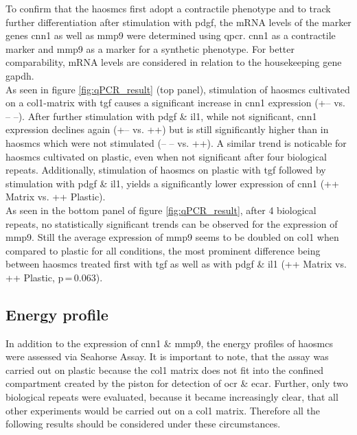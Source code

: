     To confirm that the \acp{haosmc} first adopt a contractile phenotype and to track further differentiation after stimulation with \ac{pdgf}, the \ac{mRNA} levels of the marker genes \ac{cnn1} as well as \ac{mmp9} were determined using \ac{qpcr}. \ac{cnn1} as a contractile marker and \ac{mmp9} as a marker for a synthetic phenotype. For better comparability, \ac{mRNA} levels are considered in relation to the housekeeping gene \ac{gapdh}.\\
    As seen in figure \ref{fig:qPCR_result} (top panel), stimulation of \acp{haosmc} cultivated on a \ac{col1}-matrix with \ac{tgf} causes a significant increase in \ac{cnn1} expression (+– vs. – –). After further stimulation with \ac{pdgf} \& \ac{il1}, while not significant, \ac{cnn1} expression declines again (+– vs. ++) but is still significantly higher than in \acp{haosmc} which were not stimulated (– – vs. ++). A similar trend is noticable for \acp{haosmc} cultivated on plastic, even when not significant after four biological repeats. Additionally, stimulation of \acp{haosmc} on plastic with \ac{tgf} followed by stimulation with \ac{pdgf} \& \ac{il1}, yields a significantly lower expression of \ac{cnn1} (++ Matrix vs. ++ Plastic).\\
    As seen in the bottom panel of figure \ref{fig:qPCR_result}, after 4 biological repeats, no statistically significant trends can be observed for the expression of \ac{mmp9}. Still the average expression of \ac{mmp9} seems to be doubled on \ac{col1} when compared to plastic for all conditions, the most prominent difference being between \acp{haosmc} treated first with \ac{tgf} as well as with \ac{pdgf} \& \ac{il1} (++ Matrix vs. ++ Plastic, p\,=\,0.063).


    \subsection{Energy profile}
    \label{subsec:energy}
    In addition to the expression of \ac{cnn1} \& \ac{mmp9}, the energy profiles of \acp{haosmc} were assessed via Seahorse Assay. It is important to note, that the assay was carried out on plastic because the \ac{col1} matrix does not fit into the confined compartment created by the piston for detection of \ac{ocr} \& \ac{ecar}. Further, only two biological repeats were evaluated, because it became increasingly clear, that all other experiments would be carried out on a \ac{col1} matrix. Therefore all the following results should be considered under these circumstances.

